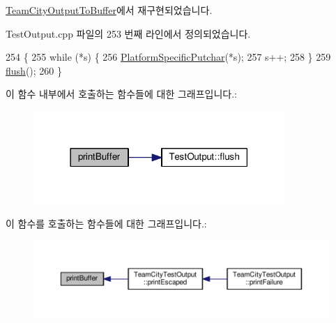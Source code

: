 \hyperlink{class_team_city_output_to_buffer_a8b83bd531b9e38a5dd9c61e14bf1636c}{Team\+City\+Output\+To\+Buffer}에서 재구현되었습니다.



Test\+Output.\+cpp 파일의 253 번째 라인에서 정의되었습니다.


\begin{DoxyCode}
254 \{
255     \textcolor{keywordflow}{while} (*s) \{
256         \hyperlink{_platform_specific_functions__c_8h_a8466312859d8a7e4782f3a476c4f010d}{PlatformSpecificPutchar}(*s);
257         s++;
258     \}
259     \hyperlink{class_console_test_output_a9fde218af86a81b79f82b86f3ddeabe5}{flush}();
260 \}
\end{DoxyCode}


이 함수 내부에서 호출하는 함수들에 대한 그래프입니다.\+:
\nopagebreak
\begin{figure}[H]
\begin{center}
\leavevmode
\includegraphics[width=270pt]{class_console_test_output_a8b83bd531b9e38a5dd9c61e14bf1636c_cgraph}
\end{center}
\end{figure}




이 함수를 호출하는 함수들에 대한 그래프입니다.\+:
\nopagebreak
\begin{figure}[H]
\begin{center}
\leavevmode
\includegraphics[width=350pt]{class_console_test_output_a8b83bd531b9e38a5dd9c61e14bf1636c_icgraph}
\end{center}
\end{figure}


